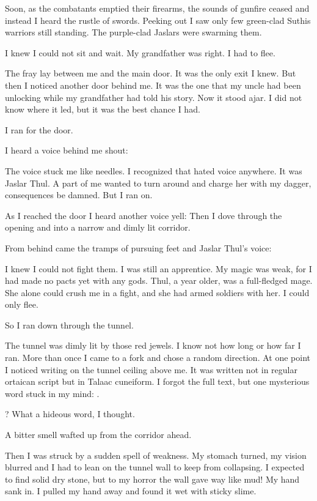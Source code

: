 \documentclass
  [a4paper,
   12pt,
   oneside
  ]%
  {article}
\begin{document}
Soon, as the combatants emptied their firearms, the sounds of gunfire ceased and 
instead I heard the rustle of swords.
Peeking out I saw only few green-clad Suthis warriors still standing. 
The purple-clad Jaslars were swarming them. 

I knew I could not sit and wait. 
My grandfather was right. 
I had to flee.

The fray lay between me and the main door. 
It was the only exit I knew. 
But then I noticed another door behind me. 
It was the one that my uncle had been unlocking while my grandfather had told his story. 
Now it stood ajar. 
I did not know where it led, but it was the best chance I had. 

I ran for the door. 

I heard a voice behind me shout:

The voice stuck me like needles. 
I recognized that hated voice anywhere.
It was Jaslar Thul.
A part of me wanted to turn around and charge her with my dagger, consequences be damned.
But I ran on.

As I reached the door I heard another voice yell: 
Then I dove through the opening and into a narrow and dimly lit corridor. 

From behind came the tramps of pursuing feet and Jaslar Thul's voice: 

I knew I could not fight them. 
I was still an apprentice. 
My magic was weak, for I had made no pacts yet with any gods.
Thul, a year older, was a full-fledged mage. 
She alone could crush me in a fight, and she had armed soldiers with her. 
I could only flee.

So I ran down through the tunnel.

The tunnel was dimly lit by those red jewels. 
I know not how long or how far I ran. 
More than once I came to a fork and chose a random direction.
At one point I noticed writing on the tunnel ceiling above me. 
It was written not in regular ortaican script but in Talaac cuneiform.%
%
\index{\Ortaican}
I forgot the full text, but one mysterious word stuck in my mind: 
\quo{\emph{\Ubloth{}}}.

\emph{\Ubloth{}}? 
What a hideous word, I thought. 

A bitter smell wafted up from the corridor ahead.

Then I was struck by a sudden spell of weakness.
My stomach turned, my vision blurred and I had to lean on the tunnel wall to keep from collapsing.
I expected to find solid dry stone, but to my horror the wall gave way like mud! 
My hand sank in. 
I pulled my hand away and found it wet with sticky slime. 
\end{document}
